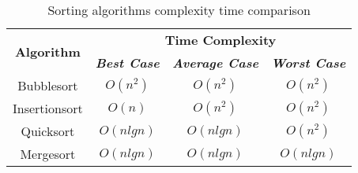 \begin{table}[htbp]
    \caption{Sorting algorithms complexity time comparison \cite{Prajapati2017}}
    \begin{center}
    \begin{tabular}{|c|c|c|c|}
    \hline
    \multirow{2}{*}{\textbf{Algorithm}}&\multicolumn{3}{|c|}{\textbf{Time Complexity}} \\
    \cline{2-4} 
    & \textbf{\textit{Best Case}} & \textbf{\textit{Average Case}}& \textbf{\textit{Worst Case}} \\
    \hline
    Bubblesort & $O(n^2)$ & $O(n^2)$ & $O(n^2)$ \\
    Insertionsort & $O(n)$ & $O(n^2)$ & $O(n^2)$ \\
    Quicksort & $O(nlgn)$ & $O(nlgn)$ & $O(n^2)$ \\
    Mergesort & $O(nlgn)$ & $O(nlgn)$ & $O(nlgn)$ \\
    \hline
    \end{tabular}
    \label{table1}
    \end{center}
    \end{table}